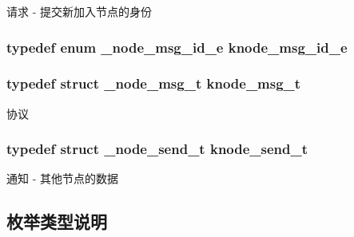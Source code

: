 请求 -\/ 提交新加入节点的身份 

\hypertarget{a00101_ae07741c75a46c112cfe323cbe86dd330_ae07741c75a46c112cfe323cbe86dd330}{}
\subsubsection[{knode\+\_\+msg\+\_\+id\+\_\+e}]{\setlength{\rightskip}{0pt plus 5cm}typedef enum {\bf \+\_\+node\+\_\+msg\+\_\+id\+\_\+e}  {\bf knode\+\_\+msg\+\_\+id\+\_\+e}}\label{a00101_ae07741c75a46c112cfe323cbe86dd330_ae07741c75a46c112cfe323cbe86dd330}
\hypertarget{a00101_a55350f9eeac5f171e5a08304f733ac48_a55350f9eeac5f171e5a08304f733ac48}{}
\subsubsection[{knode\+\_\+msg\+\_\+t}]{\setlength{\rightskip}{0pt plus 5cm}typedef struct {\bf \+\_\+node\+\_\+msg\+\_\+t}  {\bf knode\+\_\+msg\+\_\+t}}\label{a00101_a55350f9eeac5f171e5a08304f733ac48_a55350f9eeac5f171e5a08304f733ac48}


协议 

\hypertarget{a00101_a7fd7cc48c0ea89738e6bd1bb8091f9d3_a7fd7cc48c0ea89738e6bd1bb8091f9d3}{}
\subsubsection[{knode\+\_\+send\+\_\+t}]{\setlength{\rightskip}{0pt plus 5cm}typedef struct {\bf \+\_\+node\+\_\+send\+\_\+t}  {\bf knode\+\_\+send\+\_\+t}}\label{a00101_a7fd7cc48c0ea89738e6bd1bb8091f9d3_a7fd7cc48c0ea89738e6bd1bb8091f9d3}


通知 -\/ 其他节点的数据 



\subsection{枚举类型说明}
\hypertarget{a00101_a9e9638fcf1028148cae57ff95be55244_a9e9638fcf1028148cae57ff95be55244}{}
